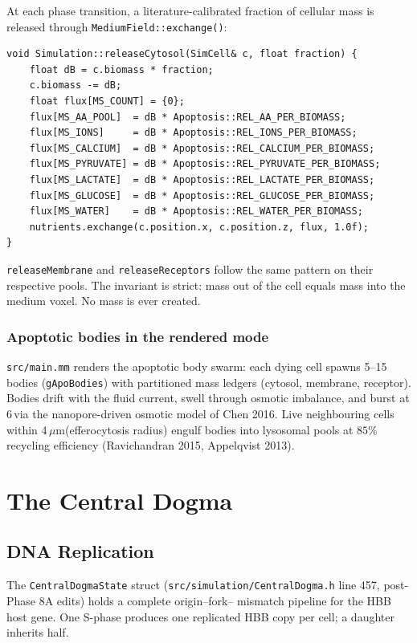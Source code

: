 \documentclass[11pt,letterpaper,twoside,openany]{book}
\newcommand{\code}[1]{\texttt{#1}}
\newcommand{\file}[1]{\texttt{\small#1}}
\newcommand{\bioh}{\text{bio-h}}
\newcommand{\um}{\ensuremath{\mu\text{m}}}
\begin{document}
At each phase transition, a literature-calibrated fraction of
cellular mass is released through \code{MediumField::exchange()}:
\begin{lstlisting}
void Simulation::releaseCytosol(SimCell& c, float fraction) {
    float dB = c.biomass * fraction;
    c.biomass -= dB;
    float flux[MS_COUNT] = {0};
    flux[MS_AA_POOL]  = dB * Apoptosis::REL_AA_PER_BIOMASS;
    flux[MS_IONS]     = dB * Apoptosis::REL_IONS_PER_BIOMASS;
    flux[MS_CALCIUM]  = dB * Apoptosis::REL_CALCIUM_PER_BIOMASS;
    flux[MS_PYRUVATE] = dB * Apoptosis::REL_PYRUVATE_PER_BIOMASS;
    flux[MS_LACTATE]  = dB * Apoptosis::REL_LACTATE_PER_BIOMASS;
    flux[MS_GLUCOSE]  = dB * Apoptosis::REL_GLUCOSE_PER_BIOMASS;
    flux[MS_WATER]    = dB * Apoptosis::REL_WATER_PER_BIOMASS;
    nutrients.exchange(c.position.x, c.position.z, flux, 1.0f);
}
\end{lstlisting}
\code{releaseMembrane} and \code{releaseReceptors} follow the same
pattern on their respective pools. The invariant is strict: mass
out of the cell equals mass into the medium voxel. No mass is ever
created.

\section{Apoptotic bodies in the rendered mode}

\file{src/main.mm} renders the apoptotic body swarm: each dying cell
spawns 5--15 bodies (\code{gApoBodies}) with partitioned mass ledgers
(cytosol, membrane, receptor). Bodies drift with the fluid current,
swell through osmotic imbalance, and burst at 6\,\bioh via the
nanopore-driven osmotic model of Chen 2016. Live neighbouring cells
within 4\,\um (efferocytosis radius) engulf bodies into lysosomal
pools at $85\%$ recycling efficiency (Ravichandran 2015,
Appelqvist 2013).

\part{The Central Dogma}

\chapter{DNA Replication}
\label{ch:replication}

The \code{CentralDogmaState} struct (\file{src/simulation/CentralDogma.h}
line 457, post-Phase 8A edits) holds a complete origin--fork--
mismatch pipeline for the HBB host gene. One S-phase produces one
replicated HBB copy per cell; a daughter inherits half.
\end{document}

